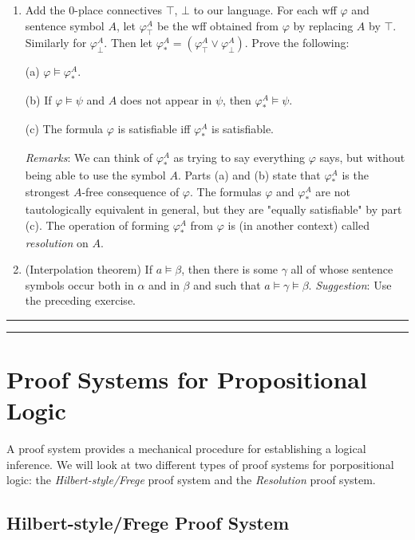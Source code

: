 \documentclass[11pt,usenames, dvipsnames]{article}
\begin{document}
\begin{enumerate}
\item Add the $0$-place connectives $\top$, $\bot$ to our language. For each wff $\varphi$ and sentence symbol $A$, let $\varphi_\top^A$ be the wff obtained from $\varphi$ by replacing $A$ by $\top$. Similarly for $\varphi_\bot^A$. Then let $\varphi_*^A = (\varphi_\top^A \vee \varphi_\bot^A)$. Prove the following:

(a) $\varphi \vDash \varphi_*^A$.

(b) If $\varphi \vDash \psi$ and $A$ does not appear in $\psi$, then $\varphi_*^A \vDash \psi$.

(c) The formula $\varphi$ is satisfiable iff $\varphi_*^A$ is satisfiable.

\textit{Remarks}: We can think of $\varphi_*^A$ as trying to say everything $\varphi$ says, but without being able to use the symbol $A$. Parts (a) and (b) state that $\varphi_*^A$ is the strongest $A$-free consequence of $\varphi$. The formulas $\varphi$ and $\varphi_*^A$ are not tautologically equivalent in general, but they are "equally satisfiable" by part (c). The operation of forming $\varphi_*^A$ from $\varphi$ is (in another context) called \textit{resolution} on $A$.

\item (Interpolation theorem) If $a \vDash \beta$, then there is some $\gamma$ all of whose sentence symbols occur both in $\alpha$ and in $\beta$ and such that $a \vDash \gamma \vDash \beta$. \textit{Suggestion}: Use the preceding exercise.
\end{enumerate}

\vspace{5truemm}
\hrule
\hrule

\section{\large \centering Proof Systems for Propositional Logic}
\noindent

A proof system provides a mechanical procedure for establishing a logical inference. We will look at two different types of proof systems for porpositional logic: the \emph{Hilbert-style/Frege} proof system and the \emph{Resolution} proof system.

\subsection{\large \centering Hilbert-style/Frege Proof System}
\noindent
\end{document}
